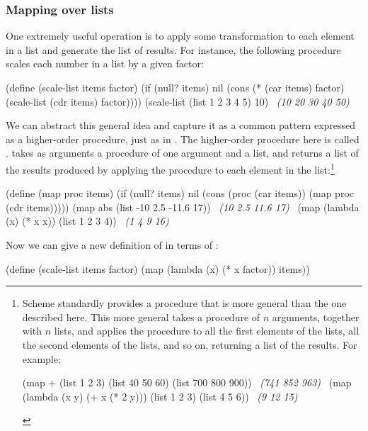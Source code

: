 \subsubsection*{Mapping over lists}

One extremely useful operation is to apply some transformation to each element
in a list and generate the list of results.  For instance, the following
procedure scales each number in a list by a given factor:

\begin{codeBlock}
(define (scale-list items factor)
  (if (null? items)
      nil
      (cons (* (car items) factor)
            (scale-list (cdr items)
                        factor))))
(scale-list (list 1 2 3 4 5) 10)
~\textit{(10 20 30 40 50)}~
\end{codeBlock}

\noindent
We can abstract this general idea and capture it as a common pattern expressed
as a higher-order procedure, just as in .  The higher-order
procedure here is called .   takes as arguments a procedure
of one argument and a list, and returns a list of the results produced by
applying the procedure to each element in the list:\footnote{\label{Footnote 12}
Scheme standardly provides a  procedure that
is more general than the one described here.  This more general 
takes a procedure of \( n \) arguments, together with \( n \) lists, and applies
the procedure to all the first elements of the lists, all the second elements
of the lists, and so on, returning a list of the results.  For example:

\begin{compactCodeBlock}
(map + (list 1 2 3) (list 40 50 60) (list 700 800 900))
~\textit{(741 852 963)}~
(map (lambda (x y) (+ x (* 2 y)))
     (list 1 2 3)
     (list 4 5 6))
~\textit{(9 12 15)}~
\end{compactCodeBlock}
}

\begin{codeBlock}
(define (map proc items)
  (if (null? items)
      nil
      (cons (proc (car items))
            (map proc (cdr items)))))
(map abs (list -10 2.5 -11.6 17))
~\textit{(10 2.5 11.6 17)}~
(map (lambda (x) (* x x)) (list 1 2 3 4))
~\textit{(1 4 9 16)}~
\end{codeBlock}

\noindent
Now we can give a new definition of  in terms of :

\begin{codeBlock}
(define (scale-list items factor)
  (map (lambda (x) (* x factor))
       items))
\end{codeBlock}

